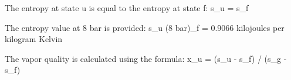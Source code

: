 The entropy at state u is equal to the entropy at state f:  
s_u = s_f  

The entropy value at 8 bar is provided:  
s_u (8 bar)_f = 0.9066 kilojoules per kilogram Kelvin  

The vapor quality is calculated using the formula:  
x_u = (s_u - s_f) / (s_g - s_f)